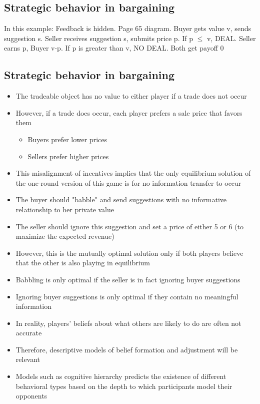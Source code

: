 \subsection{Strategic behavior in bargaining}
In this example: Feedback is hidden. Page 65 diagram. Buyer gets value v, sends suggestion s. Seller receives suggestion s, submits price p. If p $\leq$ v, DEAL. Seller earns p, Buyer v-p. If p is greater than v, NO DEAL. Both get payoff 0
\subsection{Strategic behavior in bargaining}
\begin{itemize}
    \item The tradeable object has no value to either player if a trade does not occur
    \item However, if a trade does occur, each player prefers a sale price that favors them
    \begin{itemize}
        \item Buyers prefer lower prices
        \item Sellers prefer higher prices
    \end{itemize}
    \item This misalignment of incentives implies that the only equilibrium solution of the one-round version of this game is for no information transfer to occur
    \item The buyer should "babble" and send suggestions with no informative relationship to her private value
    \item The seller should ignore this suggestion and set a price of either 5 or 6 (to maximize the expected revenue)
    \item However, this is the mutually optimal solution only if both players believe that the other is also playing in equilibrium
    \item Babbling is only optimal if the seller is in fact ignoring buyer suggestions
    \item Ignoring buyer suggestions is only optimal if they contain no meaningful information
    \item In reality, players' beliefs about what others are likely to do are often not accurate
    \item Therefore, descriptive  models of belief formation and adjustment will be relevant
    \item Models such as cognitive hierarchy predicts the existence of different behavioral types based on the depth to which participants model their opponents
\end{itemize}
